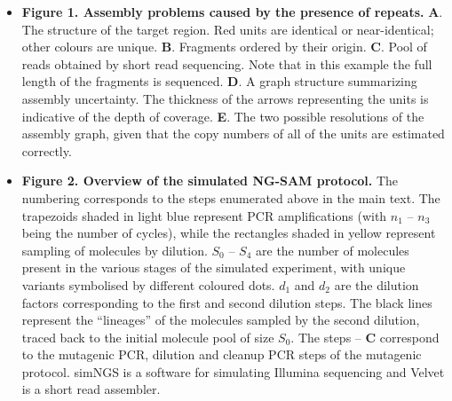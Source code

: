 \documentclass[10pt]{article}
\newcommand{\red}[1]{{\color{red} #1}}
\newcommand{\blue}[1]{{\color{blue} #1}}
\begin{document}

\begin{itemize}

\item {\bf Figure 1. Assembly problems caused by the presence of repeats.} {\bf A}. The structure of the target region. Red units are identical or near-identical; other colours are unique. {\bf B}. Fragments ordered by their origin. {\bf C}. Pool of reads obtained by short read sequencing. Note that in this example the full length of the fragments is sequenced. {\bf D}. A graph structure summarizing assembly uncertainty. The thickness of the arrows representing the units is indicative of the depth of coverage. {\bf E}. The two possible resolutions of the assembly graph, given that the copy numbers of all of the units are estimated correctly.


\item {\bf Figure 2. Overview of the simulated NG-SAM protocol.} 
The numbering corresponds to the steps enumerated above in the main text. 
The trapezoids shaded in light blue represent PCR amplifications (with $n_1$ -- $n_3$ being the number of cycles), while the rectangles shaded in yellow represent sampling of molecules by dilution.
$S_0$ -- $S_4$ are the number of molecules present in the various stages of the simulated experiment, with unique variants \blue{symbolised} by different coloured dots. $d_1$ and $d_2$ are the dilution factors corresponding to the first and second dilution steps.
The black lines represent the ``lineages'' of the molecules sampled by the second dilution, traced back to the initial molecule pool of size $S_0$. \red{The steps  -- {\bf C} correspond to the mutagenic PCR, dilution and cleanup PCR steps of the mutagenic protocol.}
simNGS \cite{simngs} is a software for simulating Illumina sequencing and Velvet \cite{Zerbino2008} is a short read assembler.



\end{itemize}
\end{document}
